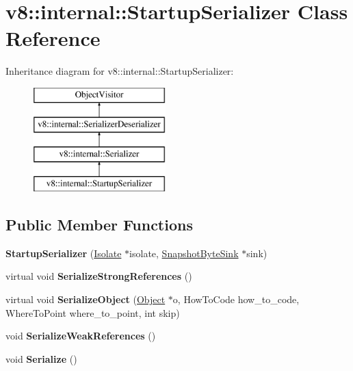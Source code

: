\hypertarget{classv8_1_1internal_1_1_startup_serializer}{}\section{v8\+:\+:internal\+:\+:Startup\+Serializer Class Reference}
\label{classv8_1_1internal_1_1_startup_serializer}
Inheritance diagram for v8\+:\+:internal\+:\+:Startup\+Serializer\+:\begin{figure}[H]
\begin{center}
\leavevmode
\includegraphics[height=4.000000cm]{classv8_1_1internal_1_1_startup_serializer}
\end{center}
\end{figure}
\subsection*{Public Member Functions}
\begin{DoxyCompactItemize}
\item 
\hypertarget{classv8_1_1internal_1_1_startup_serializer_a87280d08640c8e4201d97b404ab0d36c}{}{\bfseries Startup\+Serializer} (\hyperlink{classv8_1_1internal_1_1_isolate}{Isolate} $\ast$isolate, \hyperlink{classv8_1_1internal_1_1_snapshot_byte_sink}{Snapshot\+Byte\+Sink} $\ast$sink)\label{classv8_1_1internal_1_1_startup_serializer_a87280d08640c8e4201d97b404ab0d36c}

\item 
\hypertarget{classv8_1_1internal_1_1_startup_serializer_a17aeff9b7703a64fd9287770445ad20f}{}virtual void {\bfseries Serialize\+Strong\+References} ()\label{classv8_1_1internal_1_1_startup_serializer_a17aeff9b7703a64fd9287770445ad20f}

\item 
\hypertarget{classv8_1_1internal_1_1_startup_serializer_a5d3d5ede93895702c9853e8d0146a485}{}virtual void {\bfseries Serialize\+Object} (\hyperlink{classv8_1_1internal_1_1_object}{Object} $\ast$o, How\+To\+Code how\+\_\+to\+\_\+code, Where\+To\+Point where\+\_\+to\+\_\+point, int skip)\label{classv8_1_1internal_1_1_startup_serializer_a5d3d5ede93895702c9853e8d0146a485}

\item 
\hypertarget{classv8_1_1internal_1_1_startup_serializer_af3f5f97c5c5cd3bbc5e46d97c69c25c0}{}void {\bfseries Serialize\+Weak\+References} ()\label{classv8_1_1internal_1_1_startup_serializer_af3f5f97c5c5cd3bbc5e46d97c69c25c0}

\item 
\hypertarget{classv8_1_1internal_1_1_startup_serializer_a7129a0f241015c408cc937fc12d6475b}{}void {\bfseries Serialize} ()\label{classv8_1_1internal_1_1_startup_serializer_a7129a0f241015c408cc937fc12d6475b}

\end{DoxyCompactItemize}

